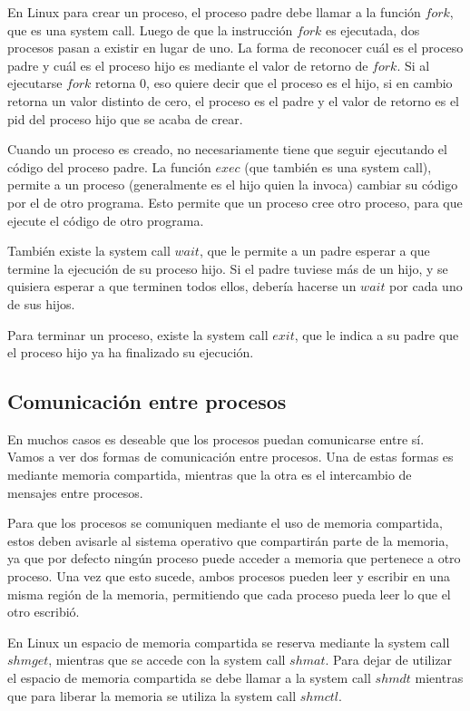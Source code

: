 \documentclass{article}
\begin{document}
En Linux para crear un proceso, el proceso padre debe llamar a la funci\'on $fork$, que es una system call. Luego de que la instrucci\'on $fork$ es ejecutada, dos procesos pasan a existir en lugar de uno. La forma de reconocer cu\'al es el proceso padre y cu\'al es el proceso hijo es mediante el valor de retorno de $fork$. Si al ejecutarse $fork$ retorna 0, eso quiere decir que el proceso es el hijo, si en cambio retorna un valor distinto de cero, el proceso es el padre y el valor de retorno es el pid del proceso hijo que se acaba de crear.

Cuando un proceso es creado, no necesariamente tiene que seguir ejecutando el c\'odigo del proceso padre. La funci\'on $exec$ (que tambi\'en es una system call), permite a un proceso (generalmente es el hijo quien la invoca) cambiar su c\'odigo por el de otro programa. Esto permite que un proceso cree otro proceso, para que ejecute el c\'odigo de otro programa.

Tambi\'en existe la system call $wait$, que le permite a un padre esperar a que termine la ejecuci\'on de su proceso hijo. Si el padre tuviese m\'as de un hijo, y se quisiera esperar a que terminen todos ellos, deber\'ia hacerse un $wait$ por cada uno de sus hijos.

Para terminar un proceso, existe la system call $exit$, que le indica a su padre que el proceso hijo ya ha finalizado su ejecuci\'on.

\subsection{Comunicaci\'on entre procesos}

En muchos casos es deseable que los procesos puedan comunicarse entre s\'i. Vamos a ver dos formas de comunicaci\'on entre procesos. Una de estas formas es mediante memoria compartida, mientras que la otra es el intercambio de mensajes entre procesos.

Para que los procesos se comuniquen mediante el uso de memoria compartida, estos deben avisarle al sistema operativo que compartir\'an parte de la memoria, ya que por defecto ning\'un proceso puede acceder a memoria que pertenece a otro proceso. Una vez que esto sucede, ambos procesos pueden leer y escribir en una misma regi\'on de la memoria, permitiendo que cada proceso pueda leer lo que el otro escribi\'o.

En Linux un espacio de memoria compartida se reserva mediante la system call $shmget$, mientras que se accede con la system call $shmat$. Para dejar de utilizar el espacio de memoria compartida se debe llamar a la system call $shmdt$ mientras que para liberar la memoria se utiliza la system call $shmctl$.
\end{document}
